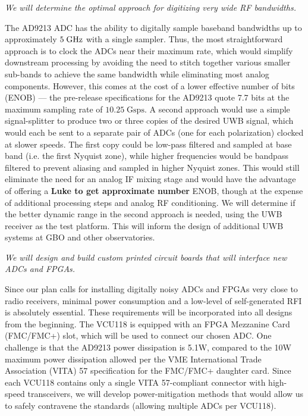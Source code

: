 \documentclass[10pt]{myNSF}
\begin{document}
\label{sec:adc_fpga}

\emph{We will determine the optimal approach for digitizing very wide
  RF bandwidths.}

The AD9213 ADC has the ability to digitally sample baseband bandwidths
up to approximately $5\; \textrm{GHz}$ with a single sampler.  Thus, the most
straightforward approach is to clock the ADCs near their maximum rate,
which would simplify downstream processing by avoiding the need to
stitch together various smaller sub-bands to achieve the same
bandwidth while eliminating most analog components.  However, this
comes at the cost of a lower effective number of bits (ENOB) --- the
pre-release specifications for the AD9213 quote 7.7 bits at the
maximum sampling rate of $10.25\; \mathrm{Gsps}$.  A second approach
would use a simple signal-splitter to produce two or three copies of
the desired UWB signal, which would each be sent to a separate pair of
ADCs (one for each polarization) clocked at slower speeds.  The first
copy could be low-pass filtered and sampled at base band (i.e. the
first Nyquist zone), while higher frequencies would be bandpass
filtered to prevent aliasing and sampled in higher Nyquist zones.
This would still eliminate the need for an analog IF mixing stage and
would have the advantage of offering a \textbf{Luke to get approximate
  number} ENOB, though at the expense of additional processing steps
and analog RF conditioning.  We will determine if the better dynamic
range in the second approach is needed, using the UWB receiver as the
test platform.  This will inform the design of additional UWB systems
at GBO and other observatories.

\label{sec:adc_fpga_integration}

\emph{We will design and build custom printed circuit boards that will
  interface new ADCs and FPGAs.}

Since our plan calls for installing digitally noisy ADCs and FPGAs
very close to radio receivers, minimal power consumption and a
low-level of self-generated RFI is absolutely essential.  These
requirements will be incorporated into all designs from the beginning.
The VCU118 is equipped with an FPGA Mezzanine Card (FMC/FMC+) slot,
which will be used to connect our chosen ADC.  One challenge is that
the AD9213 power dissipation is 5.1W, compared to the 10W maximum
power dissipation allowed per the VME International Trade Association
(VITA) 57 specification for the FMC/FMC+ daughter card.  Since each
VCU118 contains only a single VITA 57-compliant connector with
high-speed transceivers, we will develop power-mitigation methods that
would allow us to safely contravene the standards (allowing multiple
ADCs per VCU118).
\end{document}
